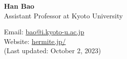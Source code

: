 \documentclass[11pt]{article}
\newcommand{\makecontact}[2]{
\noindent\begin{minipage}[t]{0.5\textwidth}
{\Huge\bfseries #1}\\[0.5em]
{\large Assistant Professor at Kyoto University}
\end{minipage}%
\hfill
\begin{minipage}[t]{0.45\textwidth}
\raggedleft
Email: \href{mailto:#2}{#2} \\
Website: \href{https://hermite.jp/}{hermite.jp/} \\
(Last updated: October 2, 2023)
\end{minipage}
}
\begin{document}
\makecontact{Han Bao}{bao@i.kyoto-u.ac.jp}

\end{document}
